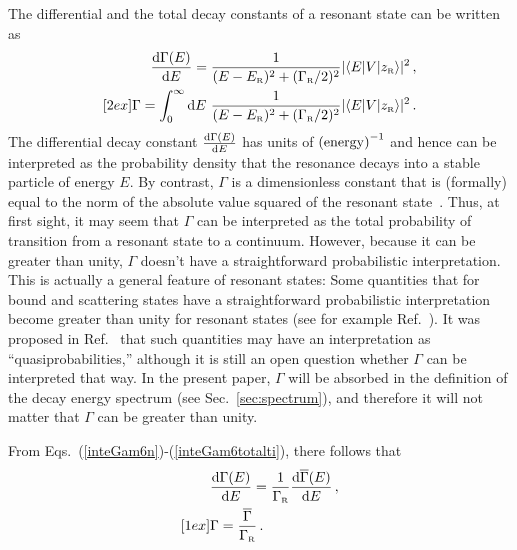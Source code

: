 \documentclass[12pt]{article}
\newcommand{\rmd}{{\rm d}}
\newcommand{\gs}{|z_{\text{\tiny R}}\rangle}
\newcommand{\gr}{\Gamma _{\text{\tiny R}}}
\newcommand{\er}{E_{\text{\tiny R}}}
\begin{document}
The differential and the total decay constants of a resonant state can be 
written as~\cite{NPA15}
\begin{eqnarray}
   \frac{\rmd \Gamma (E)}{\rmd E} =
       \frac{1}{(E-\er)^2+(\gr/2)^2} |\langle E|V \gs|^2 \, , 
         \label{inteGam6ti} \\ [2ex]
           \Gamma =  \int_0^{\infty} \rmd E \
       \frac{1}{(E-\er)^2+(\gr/2)^2} |\langle E|V \gs|^2 \, . 
         \label{inteGam6totalti}
\end{eqnarray}
The differential decay constant $\frac{\rmd \Gamma (E)}{\rmd E}$ 
has units of $\left({\rm energy}\right)^{-1}$ and hence can be
interpreted as the probability density that the resonance decays into
a stable particle of energy $E$. By contrast,
$\Gamma$ is a dimensionless constant that is (formally) equal to
the norm of the absolute value squared of the resonant 
state~\cite{NPA15}. Thus, at first sight, it may seem that $\Gamma$ 
can be interpreted as
the total probability of transition from a resonant state to a 
continuum. However, because it can be greater than unity, $\Gamma$
doesn't have a straightforward probabilistic interpretation. This is
actually a general feature of resonant states: Some quantities that
for bound and scattering states have a straightforward probabilistic 
interpretation become greater than unity for resonant states (see
for example Ref.~\cite{GASTON17}). It was proposed in Ref.~\cite{GASTON17}
that such quantities may have an interpretation as ``quasiprobabilities,''
although it is still an open question whether $\Gamma$ can be interpreted 
that way. In the present paper, $\Gamma$ will be absorbed in the definition of
the decay energy spectrum (see
Sec.~\ref{sec:spectrum}), and therefore it will not matter that $\Gamma$ can
be greater than unity.

From Eqs.~(\ref{inteGam6n})-(\ref{inteGam6totalti}), there follows that
\begin{eqnarray}
       & \frac{\rmd \Gamma (E)}{\rmd E}= \frac{1}{\gr} 
             \frac{\rmd \overline{\Gamma} (E)}{\rmd E} \, , 
            \label{rddcddw}  \\ [1ex]
      & \Gamma =  \frac{\overline{\Gamma}}{\gr} \, .
             \label{redcdw}
\end{eqnarray}
\end{document}
